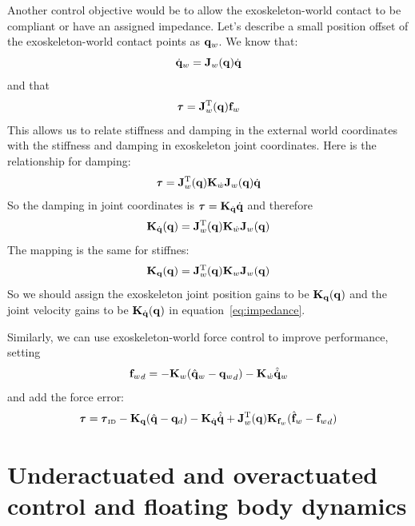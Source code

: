 \documentclass[letterpaper,12pt,fullpage]{article}
\newcommand{\invdyn}{{\mbox {\tiny ID}}}
\begin{document}
Another control objective would be to allow the exoskeleton-world contact to
be compliant or have an assigned impedance.
Let's describe a small position offset of the exoskeleton-world
contact points as ${\bf q}_w$. We know that:
\begin{equation}
\dot{{\bf q}}_w = {\bf J}_w({\bf q}) \dot{{\bf q}}
\end{equation}
and that
\begin{equation}
\vtau = \mJ_w^{\tr}(\vq) \vf_w 
\end{equation}
This allows us to relate stiffness and damping in the external world coordinates
with the stiffness and damping in exoskeleton joint coordinates.
Here is the relationship for damping:
\begin{equation}
\vtau = \mJ_w^{\tr}(\vq) \mK_{\dot{w}} \mJ_w(\vq) \dot{\vq}
\end{equation}
So the damping in joint coordinates is $\vtau = \mK_{\dot{\vq}} \dot{\vq}$ and
therefore
\begin{equation}
{\bf K}_{\dot{{\bf q}}}({\bf q}) = {\bf J}_w^{{\rm T}}({\bf q}) {\bf K}_{\dot{w}} {\bf J}_w({\bf q})
\end{equation}
The mapping is the same for stiffnes:
\begin{equation}
{\bf K}_{{\bf q}}({\bf q}) = {\bf J}_w^{{\rm T}}({\bf q}) {\bf K}_{w} {\bf J}_w({\bf q})
\end{equation}
So we should assign the exoskeleton joint position gains to be ${\bf K}_{{\bf q}}({\bf q})$ and
the joint velocity gains to be ${\bf K}_{\dot{{\bf q}}}({\bf q})$ in equation~\ref{eq:impedance}.

Similarly, we can use exoskeleton-world force control to improve performance,
setting
\begin{equation}
{{\bf f}_w}_d = - {\bf K}_w ( \hat{{\bf q}}_w - {{\bf q}_w}_d ) - {\bf K}_{\dot{w}} \hat{\dot{{\bf q}}}_w
\end{equation}
and add the force error: 
\begin{equation}
\vtau = \vtau_{\invdyn} - \mK_{\vq} ( \hat{\vq} - \vq_d ) - \mK_{\dot{\vq}} \hat{\dot{\vq}}
+ \mJ_w^{\tr}(\vq) \mK_{\vf_w} ( \hat{\vf}_w - {\vf_w}_d )
\end{equation}

\section{Underactuated and overactuated control and floating body dynamics}
\label{sec:float}
\end{document}
